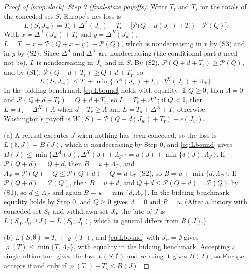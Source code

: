\begin{proof}[Proof of \cref{prop:slack}]
\emph{Step 0 (final-state payoffs).} Write $T_{\mathrm r}$ and $T_{\mathrm s}$ for the totals of the conceded set $S$. Europe's net loss is
\[
L(S,J_w)=T_{\mathrm s}+\Delta^A(J_w)+T_{\mathrm r}-\big[\mathcal P\big(Q+d(J_w)+T_{\mathrm r}\big)-\mathcal P(Q)\big].
\]
With $x=\Delta^A(J_w)+T_{\mathrm r}$ and $y=\Delta^X(J_w)$, $L=T_{\mathrm s}+x-\mathcal P(Q+x-y)+\mathcal P(Q)$, which is nondecreasing in $x$ by (S3) and in $y$ by (S2). Since $\Delta^A$ and $\Delta^X$ are nondecreasing (the conditional part $d$ need not be), $L$ is nondecreasing in $J_w$ and in $S$. By (S2), $\mathcal P(Q+d+T_{\mathrm r})\ge\mathcal P(Q)$, and by (S1), $\mathcal P(Q+d+T_{\mathrm r})\ge Q+d+T_{\mathrm r}$, so
\begin{equation}\label{eq:Lbound}
L(S,J_w)\le T_{\mathrm s}+\min\{\Delta^A(J_w)+T_{\mathrm r},\ \Delta^X(J_w)+\Lambda_{\mathcal P}\}.
\end{equation}
In the bidding benchmark \cref{eq:Lbound} holds with equality: if $Q\ge 0$, then $\Lambda=0$ and $\mathcal P(Q+d+T_{\mathrm r})=Q+d+T_{\mathrm r}$, so $L=T_{\mathrm s}+\Delta^X$; if $Q<0$, then $L=T_{\mathrm s}+\Delta^X+\Lambda$ when $d+T_{\mathrm r}\ge\Lambda$ and $L=T_{\mathrm s}+\Delta^A+T_{\mathrm r}$ otherwise. Washington's payoff is $W(S)-\mathcal P(Q+d(J_w)+T_{\mathrm r})-e(J_w)$.

(a) A refusal executes $J$ when nothing has been conceded, so the loss is $L(\emptyset,J)=B(J)$, which is nondecreasing by Step 0, and \cref{eq:Lbound} gives $B(J)\le\min\{\Delta^A(J),\Delta^X(J)+\Lambda_{\mathcal P}\}=u(J)+\min\{d(J),\Lambda_{\mathcal P}\}$. If $\mathcal P(Q+d)=Q+d$, then $B=u+\Lambda_{\mathcal P}$, and $\Lambda_{\mathcal P}=\mathcal P(Q)-Q\le\mathcal P(Q+d)-Q=d$ by (S2), so $B=u+\min\{d,\Lambda_{\mathcal P}\}$. If $\mathcal P(Q+d)=\mathcal P(Q)$, then $B=u+d$, and $Q+d\le\mathcal P(Q+d)=\mathcal P(Q)$ by (S1), so $d\le\Lambda_{\mathcal P}$ and again $B=u+\min\{d,\Lambda_{\mathcal P}\}$. In the bidding benchmark equality holds by Step 0, and $Q\ge 0$ gives $\Lambda=0$ and $B=u$. (After a history with conceded set $S_0$ and withdrawn set $J_0$, the bite of $J$ is $L(S_0,J_0\cup J)-L(S_0,J_0)$, which in general differs from $B(J)$.)

(b) $L(S,\emptyset)=T_{\mathrm s}+\varrho(T_{\mathrm r})$, and \cref{eq:Lbound} with $J_w=\emptyset$ gives $\varrho(T)\le\min\{T,\Lambda_{\mathcal P}\}$, with equality in the bidding benchmark. Accepting a single ultimatum gives the loss $L(S,\emptyset)$ and refusing it gives $B(J)$, so Europe accepts if and only if $\varrho(T_{\mathrm r})+T_{\mathrm s}\le B(J)$.


\end{proof}
